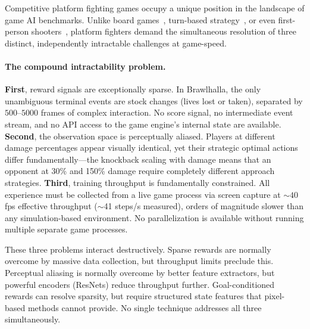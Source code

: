 \documentclass[11pt,a4paper]{article}
\begin{document}
Competitive platform fighting games occupy a unique position in the landscape of game AI benchmarks.
Unlike board games~\cite{silver2016mastering,silver2018general}, turn-based strategy~\cite{vinyals2019grandmaster}, or even first-person shooters~\cite{berner2019dota}, platform fighters demand the simultaneous resolution of three distinct, independently intractable challenges at game-speed.

\paragraph{The compound intractability problem.}
\textbf{First}, reward signals are exceptionally sparse.
In Brawlhalla, the only unambiguous terminal events are stock changes (lives lost or taken), separated by $500$--$5000$ frames of complex interaction.
No score signal, no intermediate event stream, and no API access to the game engine's internal state are available.
\textbf{Second}, the observation space is perceptually aliased.
Players at different damage percentages appear visually identical, yet their strategic optimal actions differ fundamentally---the knockback scaling with damage means that an opponent at 30\% and 150\% damage require completely different approach strategies.
\textbf{Third}, training throughput is fundamentally constrained.
All experience must be collected from a live game process via screen capture at ${\sim}40$ fps effective throughput ($\sim$41 steps/s measured), orders of magnitude slower than any simulation-based environment.
No parallelization is available without running multiple separate game processes.

These three problems interact destructively.
Sparse rewards are normally overcome by massive data collection, but throughput limits preclude this.
Perceptual aliasing is normally overcome by better feature extractors, but powerful encoders (ResNets) reduce throughput further.
Goal-conditioned rewards can resolve sparsity, but require structured state features that pixel-based methods cannot provide.
No single technique addresses all three simultaneously.
\end{document}
